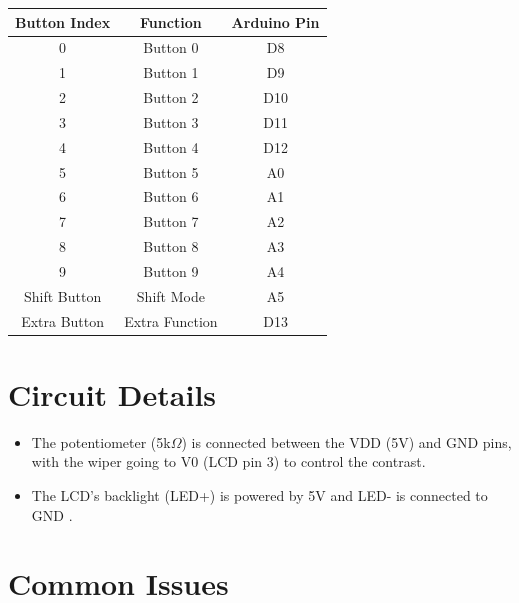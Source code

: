 \documentclass[journal]{IEEEtran}
\begin{document}
\begin{center}
\begin{tabular}{|c|c|c|}
    \hline
    \textbf{Button Index} & \textbf{Function} & \textbf{Arduino Pin} \\
    \hline
    0  & Button 0         & D8  \\
    1  & Button 1         & D9  \\
    2  & Button 2         & D10  \\
    3  & Button 3         & D11  \\
    4  & Button 4         & D12  \\
    5  & Button 5         & A0  \\
    6  & Button 6         & A1  \\
    7  & Button 7         & A2   \\
    8  & Button 8         & A3   \\
    9  & Button 9         & A4  \\
    Shift Button & Shift Mode       & A5    \\
    Extra Button & Extra Function   & D13   \\
    \hline
\end{tabular}
\end{center}

\section{Circuit Details}
\begin{itemize}
    \item The potentiometer (5k$\Omega$) is connected between the  VDD (5V)  and  GND  pins, with the wiper going to  V0 (LCD pin 3)  to control the contrast.
    \item The LCD's  backlight (LED+)  is powered by  5V  and  LED-  is connected to  GND .
\end{itemize}

\section{Common Issues}
\end{document}
